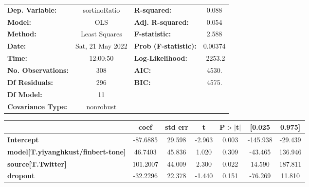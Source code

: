 \begin{center}
\begin{tabular}{lclc}
\toprule
\textbf{Dep. Variable:}                    &   sortinoRatio   & \textbf{  R-squared:         } &     0.088   \\
\textbf{Model:}                            &       OLS        & \textbf{  Adj. R-squared:    } &     0.054   \\
\textbf{Method:}                           &  Least Squares   & \textbf{  F-statistic:       } &     2.588   \\
\textbf{Date:}                             & Sat, 21 May 2022 & \textbf{  Prob (F-statistic):} &  0.00374    \\
\textbf{Time:}                             &     12:00:50     & \textbf{  Log-Likelihood:    } &   -2253.2   \\
\textbf{No. Observations:}                 &         308      & \textbf{  AIC:               } &     4530.   \\
\textbf{Df Residuals:}                     &         296      & \textbf{  BIC:               } &     4575.   \\
\textbf{Df Model:}                         &          11      & \textbf{                     } &             \\
\textbf{Covariance Type:}                  &    nonrobust     & \textbf{                     } &             \\
\bottomrule
\end{tabular}
\begin{tabular}{lcccccc}
                                           & \textbf{coef} & \textbf{std err} & \textbf{t} & \textbf{P$> |$t$|$} & \textbf{[0.025} & \textbf{0.975]}  \\
\midrule
\textbf{Intercept}                         &     -87.6885  &       29.598     &    -2.963  &         0.003        &     -145.938    &      -29.439     \\
\textbf{model[T.yiyanghkust/finbert-tone]} &      46.7403  &       45.836     &     1.020  &         0.309        &      -43.465    &      136.946     \\
\textbf{source[T.Twitter]}                 &     101.2007  &       44.009     &     2.300  &         0.022        &       14.590    &      187.811     \\
\textbf{dropout}                           &     -32.2296  &       22.378     &    -1.440  &         0.151        &      -76.269    &       11.810     \\

\end{tabular}
\end{center}
